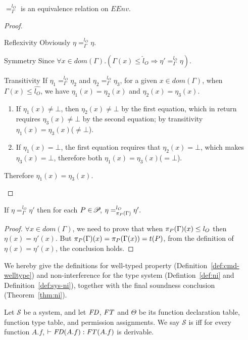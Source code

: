 {{{\begin{lemma}\label{lem:ni-eq}
$=_{\Gamma}^{l_{O}}$ is an equivalence relation on $EEnv$.
\end{lemma}
 \begin{proof}
\begin{ProofEnumDesc}[style=standard]
	\item [Reflexivity] Obviously $\eta=_{\Gamma}^{l_O}\eta$.
	\item [Symmetry] Since $\forall x\in dom(\Gamma). (\Gamma(x)\leq\hat{l}_O\Rightarrow\eta'=_{\Gamma}^{l_O}\eta)$.
	\item [Transitivity] If $\eta_1=_{\Gamma}^{l_O}\eta_2$ and $\eta_2=_{\Gamma}^{l_O}\eta_3$, for a given $x\in dom(\Gamma)$, when $\Gamma(x)\leq\hat{l_O}$, we have $\eta_1(x)=\eta_2(x)$ and $\eta_2(x)=\eta_3(x)$.
	\begin{enumerate}[label={(\arabic*)}]
	\item If $\eta_1(x)\neq\bot$, then $\eta_2(x)\neq\bot$ by the first equation, which in return requires $\eta_3(x)\neq\bot$ by the second equation; by transitivity $\eta_1(x)=\eta_3(x)$($\neq\bot$).
	\item If $\eta_1(x)=\bot$, the first equation requires that $\eta_2(x)=\bot$, which makes $\eta_3(x)=\bot$, therefore both $\eta_1(x)=\eta_3(x)$($=\bot$).
	\end{enumerate}
	Therefore $\eta_1(x)=\eta_3(x)$.
\end{ProofEnumDesc}
 \end{proof}

 \begin{lemma}\label{lem:proj}
If $\eta =_{\Gamma}^{l_{O}} \eta'$
then for each $P\in\PPS$,
$\eta =_{\app{\Gamma}{P}}^{l_O} \eta'.$
\end{lemma}
 \begin{proof}
$\forall x\in dom(\Gamma)$, we need to prove that when $\app{\Gamma}{P}(x)\leq l_O$ then $\eta(x)=\eta'(x)$. But $\app{\Gamma}{P}(x)=\app{\Gamma(x)}{P}=t(P)$, from the definition of $\eta(x)=\eta'(x)$, the conclusion holds.
 \end{proof}



We hereby give the definitions for well-typed property
(Definition~\ref{def:cmd-welltype}) and non-interference for the type
system (Defintion~\ref{def:ni} and Definition~\ref{def:sys-ni}),
together with the final soundness conclusion
(Theorem~\ref{thm:ni}).


\begin{definition}\label{def:cmd-welltype}
Let $\mathcal{S}$ be a system, and let $\FD$, $\FT$ and $\Theta$ be
its function declaration table, function type table, and permission
assignments. We say $\mathcal{S}$ is  iff for
every function $A.f$, $\vdash \FD(A.f) : \FT(A.f)$ is derivable.
\end{definition}


}}}
